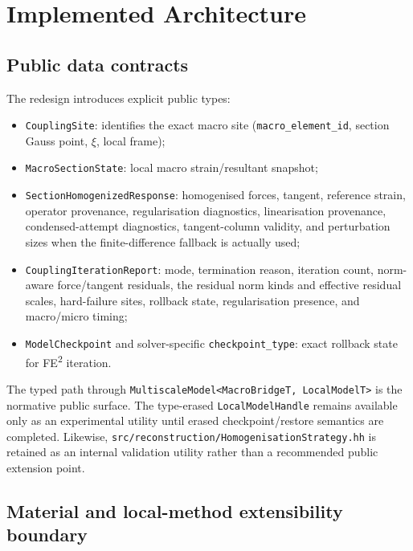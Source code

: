 \section{Implemented Architecture}
\label{sec:ms-pub-architecture}

\subsection{Public data contracts}

The redesign introduces explicit public types:
\begin{itemize}
  \item \texttt{CouplingSite}: identifies the exact macro site
    (\texttt{macro\_element\_id}, section Gauss point, \(\xi\), local frame);
  \item \texttt{MacroSectionState}: local macro strain/resultant snapshot;
  \item \texttt{SectionHomogenizedResponse}: homogenised forces, tangent,
    reference strain, operator provenance, regularisation diagnostics,
    linearisation provenance, condensed-attempt diagnostics,
    tangent-column validity, and perturbation sizes when the
    finite-difference fallback is actually used;
  \item \texttt{CouplingIterationReport}: mode, termination reason,
    iteration count, norm-aware force/tangent residuals, the residual norm
    kinds and effective residual scales, hard-failure sites, rollback state,
    regularisation presence, and macro/micro timing;
  \item \texttt{ModelCheckpoint} and solver-specific
    \texttt{checkpoint\_type}: exact rollback state for FE\textsuperscript{2}
    iteration.
\end{itemize}

The typed path through \texttt{MultiscaleModel<MacroBridgeT, LocalModelT>} is
the normative public surface.  The type-erased
\texttt{LocalModelHandle} remains available only as an experimental utility
until erased checkpoint/restore semantics are completed.  Likewise,
\texttt{src/reconstruction/HomogenisationStrategy.hh} is retained as an
internal validation utility rather than a recommended public extension point.

\subsection{Material and local-method extensibility boundary}


